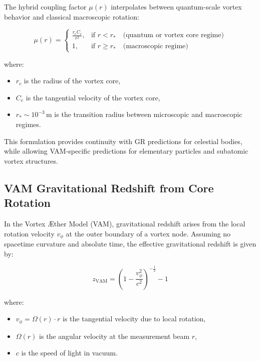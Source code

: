 The hybrid coupling factor \( \mu(r) \) interpolates between quantum-scale vortex behavior and classical macroscopic rotation:

\begin{equation}
    \mu(r) =
    \begin{cases}
        \displaystyle \frac{r_c C_e}{r^2}, & \text{if } r < r_\ast \quad \text{(quantum or vortex core regime)} \\
        1, & \text{if } r \geq r_\ast \quad \text{(macroscopic regime)}
    \end{cases}
\end{equation}

where:
\begin{itemize}
    \item \( r_c \) is the radius of the vortex core,
    \item \( C_e \) is the tangential velocity of the vortex core,
    \item \( r_\ast \sim 10^{-3} \, \text{m} \) is the transition radius between microscopic and macroscopic regimes.
\end{itemize}

This formulation provides continuity with GR predictions for celestial bodies, while allowing VAM-specific predictions for elementary particles and subatomic vortex structures.

\subsection*{VAM Gravitational Redshift from Core Rotation}

In the Vortex Æther Model (VAM), gravitational redshift arises from the local rotation velocity \( v_\phi \) at the outer boundary of a vortex node. Assuming no spacetime curvature and absolute time, the effective gravitational redshift is given by:

\begin{equation}
    z_\text{VAM} =
    \left( 1 - \frac{v_\phi^2}{c^2} \right)^{-\frac{1}{2}} - 1
\end{equation}

where:
\begin{itemize}
    \item \( v_\phi = \Omega(r) \cdot r \) is the tangential velocity due to local rotation,
    \item \( \Omega(r) \) is the angular velocity at the measurement beam \( r \),
    \item \( c \) is the speed of light in vacuum.

\end{itemize}

